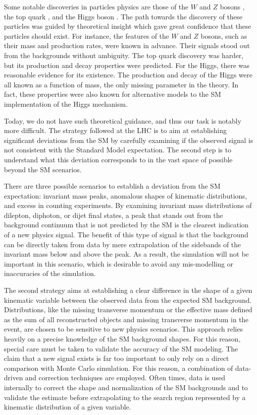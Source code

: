 Some notable discoveries in particles physics are those of the 
$W$ and $Z$ bosons \cite{Arnison:1984qu,Bagnaia:1983zx}, the top quark  
\cite{PhysRevLett.74.2626,Abachi:1995iq}, and the Higgs boson \cite{atlas_higgs, cms_higgs}.
The path towards the discovery of these particles was guided by 
theoretical insight which gave great confidence that these particles 
should exist. 
For instance, the features of the $W$ and $Z$ bosons, such as their mass 
and production rates, were known in advance. 
Their signals stood out from the backgrounds without ambiguity.
The top quark discovery was harder, but its production and decay 
properties were predicted.
For the Higgs, there was reasonable evidence for its existence.
The production and decay of the Higgs were all known as a function of 
mass, the only missing parameter in the theory. 
In fact, these properties were also known for alternative models 
to the SM implementation of the Higgs mechanism.

Today, we do not have such theoretical guidance, and thus our task 
is notably more difficult.
The strategy followed at the LHC is to aim at establishing 
significant deviations from the SM by carefully examining 
if the observed signal is not consistent with the Standard Model expectation.
The second step is to understand what this deviation corresponds to 
in the vast space of possible beyond the SM scenarios.

There are three possible scenarios to establish a deviation from  the 
SM expectation: invariant mass peaks, 
anomalous shapes of kinematic distributions, and excess in counting 
experiments.
By examining invariant mass distributions of dilepton, diphoton, or 
dijet final states, a peak that stands out from the background 
continuum that is not predicted by the SM is the clearest indication 
of a new physics signal.
The benefit of this type of signal is that the background can be directly 
taken from data by mere extrapolation of the sidebands of the invariant 
mass below and above the peak. As a result, the simulation will not 
be important in this scenario, which is desirable to avoid any 
mis-modelling or inaccuracies of the simulation.

The second strategy aims at establishing a clear difference in the shape 
of a given kinematic variable between the 
observed data from the expected SM background. 
Distributions, like the missing transverse momentum or the effective 
mass defined as the sum of all reconstructed objects 
and missing transverse momentum in the event, 
are chosen to be sensitive to new physics scenarios.
This approach relies 
heavily on a  precise knowledge of the SM background shapes.
For this reason, special care must be taken to validate the accuracy 
of the SM modeling. 
The claim that a new signal exists is far too important to only rely 
on a direct comparison with Monte Carlo simulation. For this reason, 
a combination of data-driven and correction techniques are employed. 
Often times, data is used internally to correct 
the shape and normalization of the SM backgrounds and to validate the estimate 
before extrapolating to the search region represented by a kinematic 
distribution of a given variable.

